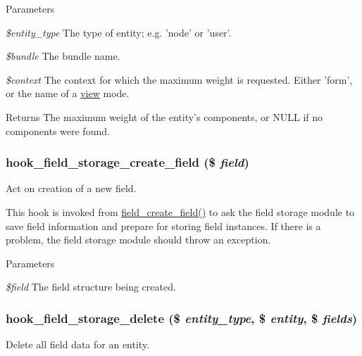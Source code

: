 \begin{DoxyParams}{Parameters}
\item[{\em \$entity\_\-type}]The type of entity; e.g. 'node' or 'user'. \item[{\em \$bundle}]The bundle name. \item[{\em \$context}]The context for which the maximum weight is requested. Either 'form', or the name of a \hyperlink{classview}{view} mode. \end{DoxyParams}
\begin{DoxyReturn}{Returns}
The maximum weight of the entity's components, or NULL if no components were found. 
\end{DoxyReturn}
\hypertarget{group__field__storage_gac345df04a43f63941dd69c7d18e83e00}{
\subsubsection[{hook\_\-field\_\-storage\_\-create\_\-field}]{\setlength{\rightskip}{0pt plus 5cm}hook\_\-field\_\-storage\_\-create\_\-field (\$ {\em field})}}
\label{group__field__storage_gac345df04a43f63941dd69c7d18e83e00}
Act on creation of a new field.

This hook is invoked from \hyperlink{group__field__crud_ga0f879889d2da2b5d638252d7eb027746}{field\_\-create\_\-field()} to ask the field storage module to save field information and prepare for storing field instances. If there is a problem, the field storage module should throw an exception.


\begin{DoxyParams}{Parameters}
\item[{\em \$field}]The field structure being created. \end{DoxyParams}
\hypertarget{group__field__storage_ga64bd5adc0e4ccc1fe52fbaabcfa10274}{
\subsubsection[{hook\_\-field\_\-storage\_\-delete}]{\setlength{\rightskip}{0pt plus 5cm}hook\_\-field\_\-storage\_\-delete (\$ {\em entity\_\-type}, \/  \$ {\em entity}, \/  \$ {\em fields})}}
\label{group__field__storage_ga64bd5adc0e4ccc1fe52fbaabcfa10274}
Delete all field data for an entity.

